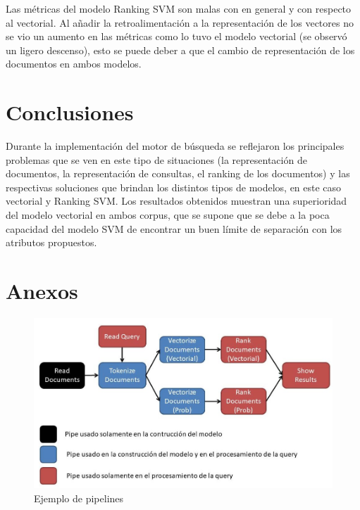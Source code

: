 \documentclass[runningheads]{llncs}
\begin{document}
Las métricas del modelo Ranking SVM son malas con en general y con respecto al vectorial. Al añadir la retroalimentación
a la representación de los vectores no se vio un aumento en las métricas como lo tuvo el modelo vectorial (se observó un
ligero descenso), esto se puede deber a que el cambio de representación de los documentos en ambos modelos.

\section{Conclusiones}

Durante la implementación del motor de búsqueda se reflejaron los principales problemas que se
ven en este tipo de situaciones (la representación de documentos, la representación de consultas, 
el ranking de los documentos) y las respectivas soluciones que brindan los distintos tipos de modelos,
en este caso vectorial y Ranking SVM. Los resultados obtenidos muestran una superioridad del modelo
vectorial en ambos corpus, que se supone que se debe a la poca capacidad del modelo SVM de encontrar
un buen límite de separación con los atributos propuestos. 

\newpage

\section{Anexos}

\begin{figure}
\includegraphics[width=\textwidth]{pipeline.jpg}
\caption{Ejemplo de pipelines} \label{pipeline_fig}
\end{figure}
\end{document}
